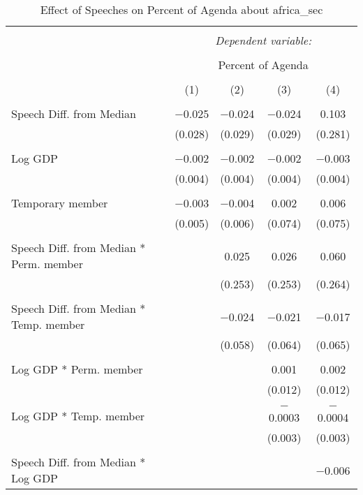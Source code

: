 
\begin{table}[!htbp] \centering 
  \caption{Effect of Speeches on Percent of Agenda about africa_sec} 
  \label{} 
\begin{tabular}{@{\extracolsep{5pt}}lcccc} 
\\[-1.8ex]\hline 
\hline \\[-1.8ex] 
 & \multicolumn{4}{c}{\textit{Dependent variable:}} \\ 
\cline{2-5} 
\\[-1.8ex] & \multicolumn{4}{c}{Percent of Agenda} \\ 
\\[-1.8ex] & (1) & (2) & (3) & (4)\\ 
\hline \\[-1.8ex] 
 Speech Diff. from Median & $-$0.025 & $-$0.024 & $-$0.024 & 0.103 \\ 
  & (0.028) & (0.029) & (0.029) & (0.281) \\ 
  & & & & \\ 
 Log GDP & $-$0.002 & $-$0.002 & $-$0.002 & $-$0.003 \\ 
  & (0.004) & (0.004) & (0.004) & (0.004) \\ 
  & & & & \\ 
 Temporary member & $-$0.003 & $-$0.004 & 0.002 & 0.006 \\ 
  & (0.005) & (0.006) & (0.074) & (0.075) \\ 
  & & & & \\ 
 Speech Diff. from Median * Perm. member &  & 0.025 & 0.026 & 0.060 \\ 
  &  & (0.253) & (0.253) & (0.264) \\ 
  & & & & \\ 
 Speech Diff. from Median * Temp. member &  & $-$0.024 & $-$0.021 & $-$0.017 \\ 
  &  & (0.058) & (0.064) & (0.065) \\ 
  & & & & \\ 
 Log GDP * Perm. member &  &  & 0.001 & 0.002 \\ 
  &  &  & (0.012) & (0.012) \\ 
  & & & & \\ 
 Log GDP * Temp. member &  &  & $-$0.0003 & $-$0.0004 \\ 
  &  &  & (0.003) & (0.003) \\ 
  & & & & \\ 
 Speech Diff. from Median * Log GDP &  &  &  & $-$0.006 \\ 

\end{tabular}
\end{table}
